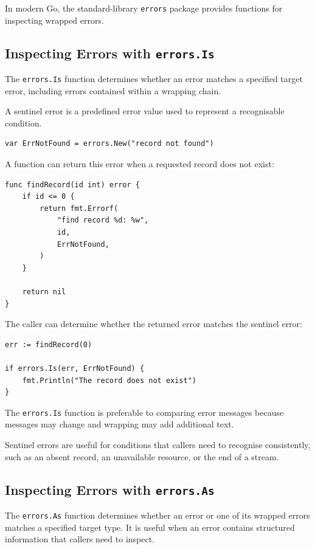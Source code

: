 In modern Go, the standard-library \texttt{errors} package provides functions for inspecting wrapped errors.

\subsection{Inspecting Errors with \texttt{errors.Is}}

The \texttt{errors.Is} function determines whether an error matches a specified target error, including errors contained within a wrapping chain.

A sentinel error is a predefined error value used to represent a recognisable condition.

\begin{lstlisting}
var ErrNotFound = errors.New("record not found")
\end{lstlisting}

A function can return this error when a requested record does not exist:

\begin{lstlisting}
func findRecord(id int) error {
    if id <= 0 {
        return fmt.Errorf(
            "find record %d: %w",
            id,
            ErrNotFound,
        )
    }

    return nil
}
\end{lstlisting}

The caller can determine whether the returned error matches the sentinel error:

\begin{lstlisting}
err := findRecord(0)

if errors.Is(err, ErrNotFound) {
    fmt.Println("The record does not exist")
}
\end{lstlisting}

The \texttt{errors.Is} function is preferable to comparing error messages because messages may change and wrapping may add additional text.

Sentinel errors are useful for conditions that callers need to recognise consistently, such as an absent record, an unavailable resource, or the end of a stream.

\subsection{Inspecting Errors with \texttt{errors.As}}

The \texttt{errors.As} function determines whether an error or one of its wrapped errors matches a specified target type. It is useful when an error contains structured information that callers need to inspect.

